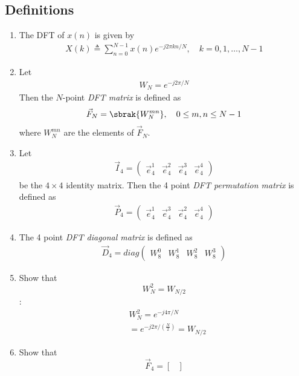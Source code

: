 \documentclass[journal,12pt,twocolumn]{IEEEtran}
\newcommand{\myvec}[1]{\ensuremath{\begin{pmatrix}#1\end{pmatrix}}}
\renewcommand\thesection{\arabic{section}}
\begin{document}
 \subsection{Definitions}
\begin{enumerate}[label=\arabic*.,ref=\thesection.\theenumi]
    \item The DFT of $x(n)$ is given by
    \begin{align}
        X(k) \triangleq \sum_{n=0}^{N-1} x(n) e^{-j 2 \pi k n / N}, \quad k=0,1, \ldots, N-1
    \end{align}
\item Let 
	\begin{align}
W_{N} = e^{-j2\pi/N} 
	\end{align}
		Then the $N$-point {\em DFT matrix} is defined as 
	\begin{align}
		\vec{F}_{N} = \sbrak{W_{N}^{mn}}, \quad 0 \le m,n \le N-1 
	\end{align}
	where $W_{N}^{mn}$ are the elements of $\vec{F}_{N}$.
\item Let 
	\begin{align}
		\vec{I}_4 = \myvec{\vec{e}_4^{1} &\vec{e}_4^{2} &\vec{e}_4^{3} &\vec{e}_4^{4} }
	\end{align}
		be the $4\times 4$ identity matrix.  Then the 4 point {\em DFT permutation matrix} is defined as 
	\begin{align}
		\vec{P}_4 = \myvec{\vec{e}_4^{1} &\vec{e}_4^{3} &\vec{e}_4^{2} &\vec{e}_4^{4} }
	\end{align}
\item The 4 point {\em DFT diagonal matrix} is defined as 
	\begin{align}
		\vec{D}_4 = diag\myvec{W_{8}^{0} & W_{8}^{1} & W_{8}^{2} & W_{8}^{3}}
	\end{align}
\item Show that 
\begin{equation}
    W_{N}^{2}=W_{N/2}
\end{equation}
\solution:
\begin{align}
&W_{N}^2 = e^{-j4\pi/N} \\
&=e^{-j2\pi/\left(\frac{N}{2}\right)}=W_{N/2}
\end{align}
    \item Show that 
\begin{equation}
	\vec{F}_{4}=
\begin{bmatrix}

\end{bmatrix}
\end{equation}
\end{enumerate}
\end{document}
